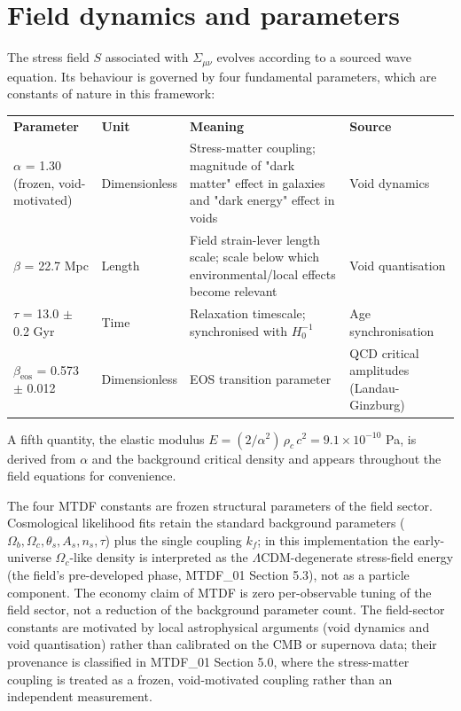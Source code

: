\documentclass[11pt,a4paper]{article}
\begin{document}
\section{Field dynamics and parameters}
\label{sec:sec4}
The stress field $S$ associated with $\Sigma_{\mu\nu}$ evolves according to a sourced wave equation. Its behaviour is governed by four fundamental parameters, which are constants of nature in this framework:

\begin{table}[H]
\centering
\footnotesize
\begin{tabularx}{\linewidth}{l>{\RaggedRight\arraybackslash}X>{\RaggedRight\arraybackslash}X>{\RaggedRight\arraybackslash}X}
\toprule
\textbf{Parameter} & \textbf{Unit} & \textbf{Meaning} & \textbf{Source} \tabularnewline
$\alpha$ = 1.30 (frozen, void-motivated) & Dimensionless & Stress-matter coupling; magnitude of "dark matter" effect in galaxies and "dark energy" effect in voids & Void dynamics \tabularnewline
$\beta$ = 22.7 Mpc & Length & Field strain-lever length scale; scale below which environmental/\allowbreak{}local effects become relevant & Void quantisation \tabularnewline
$\tau$ = 13.0 $\pm$ 0.2 Gyr & Time & Relaxation timescale; synchronised with $H_0^{-1}$ & Age synchronisation \tabularnewline
$\beta_\text{eos}$ = 0.573 $\pm$ 0.012 & Dimensionless & EOS transition parameter & QCD critical amplitudes (Landau-Ginzburg) \tabularnewline
\bottomrule
\end{tabularx}
\end{table}

A fifth quantity, the elastic modulus $E = (2/\alpha^2)\,\rho_c\,c^2 = 9.1 \times 10^{-10}$ Pa, is derived from $\alpha$ and the background critical density and appears throughout the field equations for convenience.

The four MTDF constants are frozen structural parameters of the field sector. Cosmological likelihood fits retain the standard background parameters ($\Omega_b, \Omega_c, \theta_s, A_s, n_s, \tau$) plus the single coupling $k_f$; in this implementation the early-universe $\Omega_c$-like density is interpreted as the $\Lambda$CDM-degenerate stress-field energy (the field's pre-developed phase, MTDF\_\allowbreak{}01 Section 5.3), not as a particle component. The economy claim of MTDF is zero per-observable tuning of the field sector, not a reduction of the background parameter count. The field-sector constants are motivated by local astrophysical arguments (void dynamics and void quantisation) rather than calibrated on the CMB or supernova data; their provenance is classified in MTDF\_\allowbreak{}01 Section 5.0, where the stress-matter coupling is treated as a frozen, void-motivated coupling rather than an independent measurement.
\end{document}
